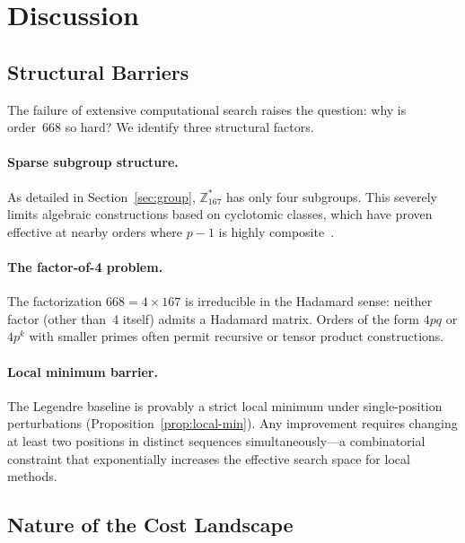 \documentclass[11pt,a4paper]{article}
\newcommand{\ZZ}{\mathbb{Z}}
\begin{document}
\section{Discussion}\label{sec:discussion}

\subsection{Structural Barriers}

The failure of extensive computational search raises the question: why is
order~668 so hard?  We identify three structural factors.

\paragraph{Sparse subgroup structure.}
As detailed in Section~\ref{sec:group}, $\ZZ_{167}^*$ has only four
subgroups.  This severely limits algebraic constructions based on
cyclotomic classes, which have proven effective at nearby orders where
$p - 1$ is highly composite~\cite{seberry2020hadamard_monograph}.

\paragraph{The factor-of-4 problem.}
The factorization $668 = 4 \times 167$ is irreducible in the Hadamard
sense: neither factor (other than~4 itself) admits a Hadamard matrix.
Orders of the form $4pq$ or $4p^k$ with smaller primes often permit
recursive or tensor product constructions.

\paragraph{Local minimum barrier.}
The Legendre baseline is provably a strict local minimum under
single-position perturbations (Proposition~\ref{prop:local-min}).  Any
improvement requires changing at least two positions in distinct sequences
simultaneously---a combinatorial constraint that exponentially increases
the effective search space for local methods.

\subsection{Nature of the Cost Landscape}
\end{document}

